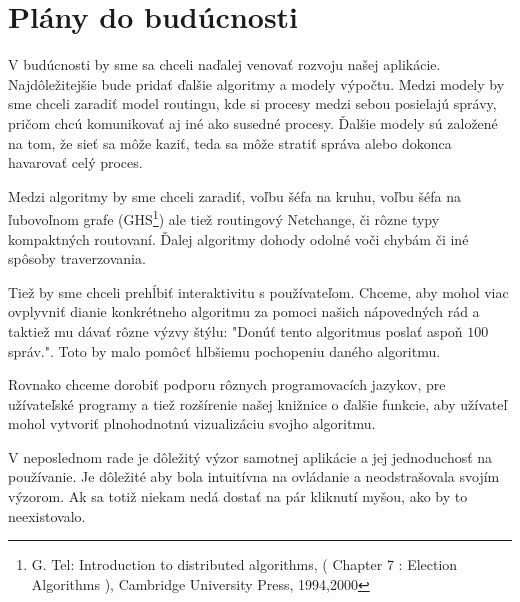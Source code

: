 \section{Plány do budúcnosti}

V budúcnosti by sme sa chceli naďalej venovať rozvoju našej aplikácie. Najdôležitejšie bude pridať
ďalšie algoritmy a modely výpočtu. Medzi modely by sme chceli zaradiť model routingu, kde si procesy
medzi sebou posielajú správy, pričom chcú komunikovať aj iné ako susedné procesy. Ďalšie modely sú
založené na tom, že sieť sa môže kaziť, teda sa môže stratiť správa alebo dokonca havarovať celý
proces.

Medzi algoritmy by sme chceli zaradiť, voľbu šéfa na kruhu, voľbu šéfa na ľubovoľnom grafe
(GHS\footnote{G. Tel: Introduction to distributed algorithms, ( Chapter 7 : Election Algorithms ),
Cambridge University Press, 1994,2000}) ale
tiež routingový Netchange, či rôzne typy kompaktných routovaní. Ďalej algoritmy dohody odolné voči
chybám či iné spôsoby traverzovania.

Tiež by sme chceli prehĺbiť interaktivitu s používateľom. Chceme, aby mohol viac ovplyvniť dianie
konkrétneho algoritmu za pomoci našich nápovedných rád a taktiež mu dávať rôzne výzvy štýlu: "Donúť
tento algoritmus poslať aspoň $100$ správ.". Toto by malo pomôcť hlbšiemu pochopeniu daného
algoritmu.

Rovnako chceme dorobiť podporu rôznych programovacích jazykov, pre užívateľské programy a tiež
rozšírenie našej knižnice o ďalšie funkcie, aby užívateľ mohol vytvoriť plnohodnotnú vizualizáciu
svojho algoritmu.

V neposlednom rade je dôležitý výzor samotnej aplikácie a jej jednoduchosť na používanie. Je
dôležité aby bola intuitívna na ovládanie a neodstrašovala svojím výzorom. Ak sa totiž niekam nedá
dostať na pár kliknutí myšou, ako by to neexistovalo.
